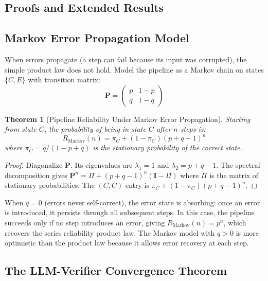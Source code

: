 \documentclass[11pt, a4paper, copyright]{googledeepmind}
\newtheorem{theorem}{Theorem}[section]
\begin{document}
\begin{appendices}
\section{Proofs and Extended Results}
\label{app:proofs}

\subsection{Markov Error Propagation Model}

When errors propagate (a step can fail because its input was corrupted), the simple product law does not hold.
Model the pipeline as a Markov chain on states $\{C, E\}$ with transition matrix:
\begin{equation}
\mathbf{P} = \begin{pmatrix} p & 1 - p \\ q & 1 - q \end{pmatrix}
\end{equation}

\begin{theorem}[Pipeline Reliability Under Markov Error Propagation]
Starting from state $C$, the probability of being in state $C$ after $n$ steps is:
\begin{equation}
R_{\text{Markov}}(n) = \pi_C + (1 - \pi_C)(p + q - 1)^n
\end{equation}
where $\pi_C = q/(1 - p + q)$ is the stationary probability of the correct state.
\end{theorem}

\begin{proof}
Diagonalize $\mathbf{P}$.
Its eigenvalues are $\lambda_1 = 1$ and $\lambda_2 = p + q - 1$.
The spectral decomposition gives $\mathbf{P}^n = \Pi + (p+q-1)^n(\mathbf{I} - \Pi)$ where $\Pi$ is the matrix of stationary probabilities.
The $(C,C)$ entry is $\pi_C + (1 - \pi_C)(p+q-1)^n$.
\end{proof}

When $q = 0$ (errors never self-correct), the error state is absorbing: once an error is introduced, it persists through all subsequent steps.
In this case, the pipeline succeeds only if no step introduces an error, giving $R_{\text{Markov}}(n) = p^n$, which recovers the series reliability product law.
The Markov model with $q > 0$ is more optimistic than the product law because it allows error recovery at each step.

\subsection{The LLM-Verifier Convergence Theorem}


\end{appendices}
\end{document}
